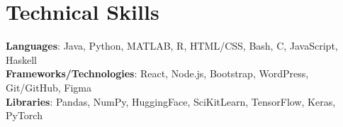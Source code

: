 \section{Technical Skills}
 \begin{itemize}[leftmargin=0.15in, label={}]
    \small{\item{
     \textbf{Languages}{: Java, Python, MATLAB, R, HTML/CSS, Bash, C, JavaScript, Haskell} \\
     \textbf{Frameworks/Technologies}{: React, Node.js, Bootstrap, WordPress, Git/GitHub, Figma} \\
     \textbf{Libraries}{: Pandas, NumPy, HuggingFace, SciKitLearn, TensorFlow, Keras, PyTorch}
    }}
 \end{itemize}